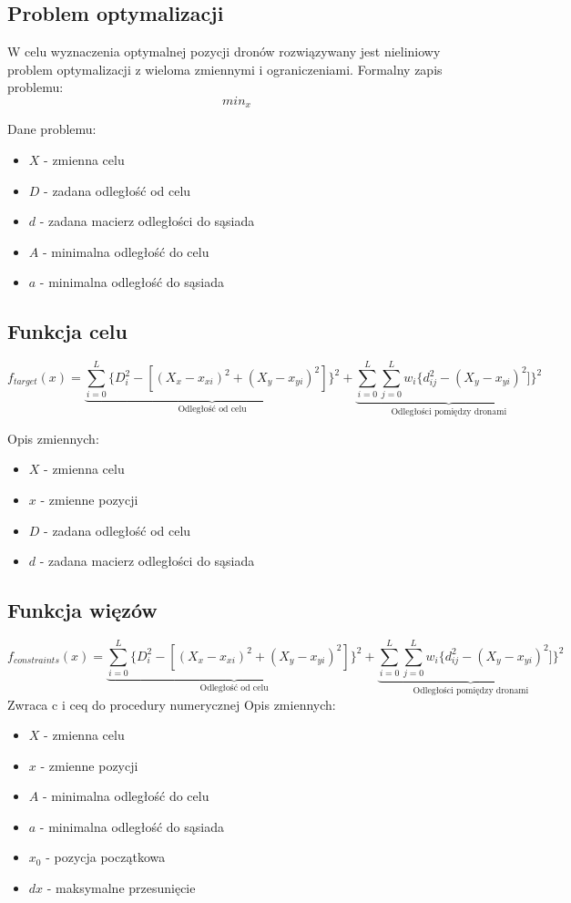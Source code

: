 \documentclass[a4paper, 11pt, oneside]{article}
\begin{document}
\subsection{Problem optymalizacji}
W celu wyznaczenia optymalnej pozycji dronów rozwiązywany jest nieliniowy problem optymalizacji z wieloma zmiennymi i ograniczeniami. Formalny zapis problemu:
\begin{equation}
min_{x}
\end{equation}


Dane problemu:
\begin{itemize}
\item $X$ - zmienna celu
\item $D$ - zadana odległość od celu
\item $d$ - zadana macierz odległości do sąsiada
\item $A$  - minimalna odległość do celu
\item $a$ -  minimalna odległość do sąsiada
\end{itemize}
\subsection{Funkcja celu}

\begin{equation}
f_{target}(x)= \underbrace{\sum_{i=0}^{L}\lbrace D_i^2 - [(X_x -x_{xi})^2+(X_y -x_{yi})^2] \rbrace ^2}_\text{Odległość od celu} +
\underbrace{\sum_{i=0}^{L}\sum_{j=0}^{L}w_i\lbrace d_{ij}^2 -(X_y -x_{yi})^2]\rbrace ^2}_\text{Odległości pomiędzy dronami}
\end{equation}

Opis zmiennych:
\begin{itemize}
\item $X$ - zmienna celu
\item $x$ - zmienne pozycji 
\item $D$ - zadana odległość od celu
\item $d$ - zadana macierz odległości do sąsiada
\end{itemize}
\subsection{Funkcja więzów}
\begin{equation}
f_{constraints}(x)= \underbrace{\sum_{i=0}^{L}\lbrace D_i^2 - [(X_x -x_{xi})^2+(X_y -x_{yi})^2] \rbrace ^2}_\text{Odległość od celu} +
\underbrace{\sum_{i=0}^{L}\sum_{j=0}^{L}w_i\lbrace d_{ij}^2 -(X_y -x_{yi})^2]\rbrace ^2}_\text{Odległości pomiędzy dronami}
\end{equation}
Zwraca c i ceq do procedury numerycznej
Opis zmiennych:
\begin{itemize}
\item $X$ - zmienna celu
\item $x$ - zmienne pozycji
\item $A$  - minimalna odległość do celu
\item $a$ -  minimalna odległość do sąsiada
\item $x_0$ - pozycja początkowa
\item $dx$ - maksymalne przesunięcie
\end{itemize}
\end{document}
